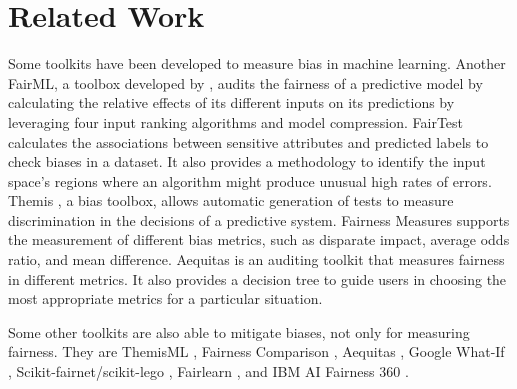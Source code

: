 \documentclass[sigconf]{acmart}
\begin{document}
{%
	
	\section{Related Work}
	\label{sec:related_work}
	
	Some toolkits have been developed to measure bias in machine learning. 
	Another FairML, a toolbox developed by \cite{adebayo2016fairml}, audits the fairness of a predictive model by calculating the relative effects of its different inputs on its predictions by leveraging four input ranking algorithms and model compression. 
	FairTest \cite{tramer2017fairtest} calculates the associations between sensitive attributes and predicted labels to check biases in a dataset. It also provides a methodology to identify the input space's regions where an algorithm might produce unusual high rates of errors.
	Themis \cite{galhotra2017themis}, a bias toolbox, allows automatic generation of tests to measure discrimination in the decisions of a predictive system.
	Fairness Measures \cite{zehlike2017fairness} supports the measurement of different bias metrics, such as disparate impact, average odds ratio, and mean difference. 
	Aequitas \cite{saleiro2019aequitas} is an auditing toolkit that measures fairness in different metrics. It also provides a decision tree to guide users in choosing the most appropriate metrics for a particular situation. 
	
	Some other toolkits are also able to mitigate biases, not only for measuring fairness. They are ThemisML \cite{bantilan2018themis}, Fairness Comparison \cite{friedler2019fairness}, Aequitas \cite{saleiro2019aequitas}, Google What-If \cite{googlewhatif2020}, Scikit-fairnet/scikit-lego \cite{scikitfairness2022,scikitlego2022}, Fairlearn \cite{bird2020fairlearn}, and IBM AI Fairness 360 \cite{bellamy2018ai}.
	
}
\end{document}
